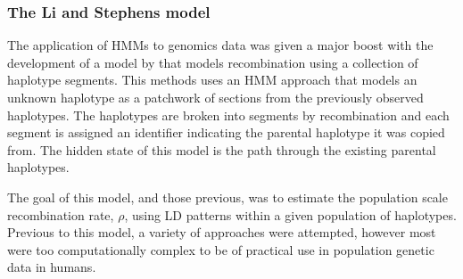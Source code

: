 
\subsubsection{The Li and Stephens model}
The application of HMMs to genomics data was given a major boost with the development of a model by \citet{Li2003} that models recombination using a collection of haplotype segments.
This methods uses an HMM approach that models an unknown haplotype as a patchwork of sections from the previously observed haplotypes.
The haplotypes are broken into segments by recombination and each segment is assigned an identifier indicating the parental haplotype it was copied from.
The hidden state of this model is the path through the existing parental haplotypes.

The goal of this model, and those previous, was to estimate the population scale recombination rate, $\rho$, using LD patterns within a given population of haplotypes.
Previous to this model, a variety of approaches were attempted, however most were too computationally complex to be of practical use in population genetic data in humans\cite{Wall2000,Fearnhead2001}.

